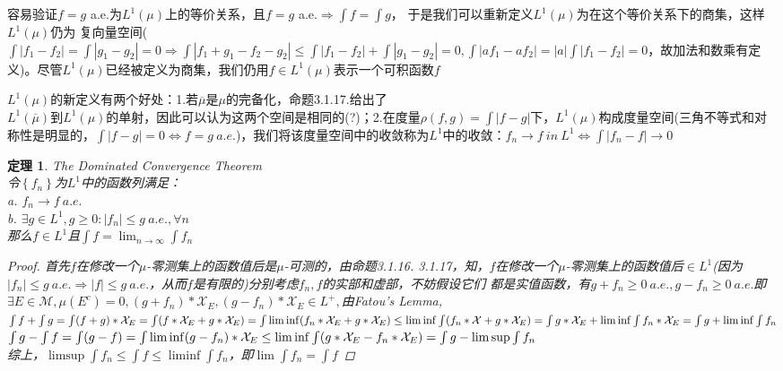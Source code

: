 \documentclass[12pt, a4paper, oneside]{ctexbook}
\newtheorem{theorem}{定理}[section]
\begin{document}
容易验证$f=g$ a.e.为$L^1(\mu)$上的等价关系，且$f=g$ a.e.$\Rightarrow \int f=\int g$，
于是我们可以重新定义$L^1(\mu)$为在这个等价关系下的商集，这样$L^1(\mu)$仍为
复向量空间($\int |f_1-f_2|=\int |g_1-g_2|=0\Rightarrow \int|f_1+g_1-f_2-g_2|\leq\int|f_1-
f_2|+\int|g_1-g_2|=0,\int|af_1-af_2|=|a|\int|f_1-f_2|=0$，故加法和数乘有定
义)。尽管$L^1(\mu)$已经被定义为商集，我们仍用$f\in L^1(\mu)$表示一个可积函数$f$

$L^1(\mu)$的新定义有两个好处：1.若$\overline{\mu}$是$\mu$的完备化，命题3.1.17.给出了\\
$L^1(\overline{\mu})$到$L^1(\mu)$的单射，因此可以认为这两个空间是相同的(?)；2.在度量$\rho(f,g)=
\int |f-g|$下，$L^1(\mu)$构成度量空间(三角不等式和对称性是明显的，$\int|f-g|=
0\Leftrightarrow f=g\ a.e.$)，我们将该度量空间中的收敛称为$L^1$中的收敛：$f_n\to
 f\ in\ L^1\Leftrightarrow \int|f_n-f|\to 0$
\begin{theorem}The Dominated Convergence Theorem
 \\令$\left\{f_n\right\}$为$L^1$中的函数列满足：\\
 a. $f_n\to f\ a.e.$\\
 b. $\exists g\in L^1,g\geq 0:|f_n|\leq g\ a.e.,\forall n$\\
 那么$f\in L^1$且$\int f=\lim_{n\to\infty}\int f_n$
 \begin{proof}
    首先$f$在修改一个$\mu$-零测集上的函数值后是$\mu$-可测的，由命题3.1.16. 
    3.1.17，知，$f$在修改一个$\mu$-零测集上的函数值后$\in L^1$(因为$|f_n|\leq g\ a.e.\Rightarrow 
    |f|\leq g\ a.e.$，从而$f$是有限的)分别考虑$f_n,f$的实部和虚部，不妨假设它们
    都是实值函数，有$g+f_n\geq 0\ a.e.,g-f_n\geq 0\ a.e.$即$\exists E\in\mathcal{M},\mu(E^c)=
    0,(g+f_n)*\mathcal{X}_{E},(g-f_n)*\mathcal{X}_{E}\in L^+,$由Fatou's Lemma,\\
    $\int f+\int g=\int (f+g)*\mathcal{X}_E=\int (f*\mathcal{X}_E+g*\mathcal{X}_E)=\int\liminf(f_n*\mathcal{X}_E+g*\mathcal{X}_E)\\
    \leq\liminf\int (f_n*\mathcal{X}+g*\mathcal{X}_E)=\int g*\mathcal{X}_E+\liminf\int f_n*\mathcal{X}_E\\
    =\int g+\liminf\int f_n$\\
    $\int g-\int f=\int(g-f)=\int\liminf(g-f_n)*\mathcal{X}_E\leq\liminf\int(g*\mathcal{X}_E-f_n*\mathcal{X}_E)\\
    =\int g-\limsup\int f_n$\\
    综上，$\limsup\int f_n\leq\int f\leq\liminf\int f_n$，即$\lim\int f_n=\int f$
 \end{proof}   
\end{theorem}
\end{document}
